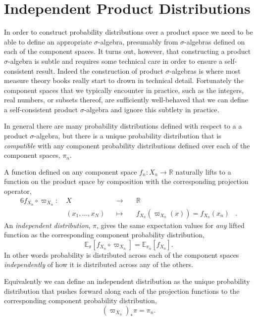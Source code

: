 \documentclass[]{article}
\begin{document}
\hypertarget{independent-product-distributions}{%
\section{Independent Product
Distributions}\label{independent-product-distributions}}

In order to construct probability distributions over a product space we
need to be able to define an appropriate \(\sigma\)-algebra, presumably
from \(\sigma\)-algebras defined on each of the component spaces. It
turns out, however, that constructing a product \(\sigma\)-algebra is
subtle and requires some technical care in order to ensure a
self-consistent result. Indeed the construction of product
\(\sigma\)-algebras is where most measure theory books really start to
drown in technical detail. Fortunately the component spaces that we
typically encounter in practice, such as the integers, real numbers, or
subsets thereof, are sufficiently well-behaved that we can define a
self-consistent product \(\sigma\)-algebra and ignore this subtlety in
practice.

In general there are many probability distributions defined with respect
to a a product \(\sigma\)-algebra, but there is a unique probability
distribution that is \emph{compatible} with any component probability
distributions defined over each of the component spaces, \(\pi_{n}\).

A function defined on any component space
\(f_{n} : X_{n} \rightarrow \mathbb{R}\) naturally lifts to a function
on the product space by composition with the corresponding projection
operator, \[
\begin{aligned}{6}
f_{X_{n}} \circ \varpi_{X_{n}} :\; &X& &\rightarrow& \; &\mathbb{R}&
\\
&(x_{1}, \ldots, x_{N})& &\mapsto& &f_{X_{n}}(\varpi_{X_{n}}(x)) = f_{X_{n}}(x_{n})&.
\end{aligned}
\] An \emph{independent distribution}, \(\pi\), gives the same
expectation values for \emph{any} lifted function as the corresponding
component probability distribution, \[
\mathbb{E}_{\pi}[ f_{X_{n}} \circ \varpi_{X_{n}} ]
=
\mathbb{E}_{\pi_{n}} [ f_{X_{n}} ].
\] In other words probability is distributed across each of the
component spaces \emph{independently} of how it is distributed across
any of the others.

Equivalently we can define an independent distribution as the unique
probability distribution that pushes forward along each of the
projection functions to the corresponding component probability
distribution, \[
(\varpi_{X_{n}})_{*} \pi = \pi_{n}.
\]
\end{document}
